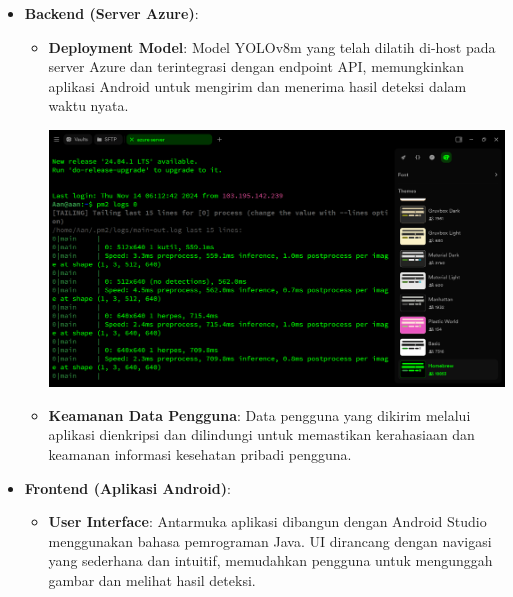 \documentclass[journal,article,submit,pdftex,moreauthors]{Definitions/mdpi}
\begin{document}
\begin{itemize}
    \item \textbf{Backend (Server Azure)}:
    \begin{itemize}
        \item \textbf{Deployment Model}: Model YOLOv8m yang telah dilatih di-host pada server Azure dan terintegrasi dengan endpoint API, memungkinkan aplikasi Android untuk mengirim dan menerima hasil deteksi dalam waktu nyata.

         \begin{minipage}{0.9\textwidth}
            \centering
            \includegraphics[width=\textwidth]{images/azure.png}
            \vspace{-15pt}
            \captionsetup{justification=centering, margin=130pt}
        \end{minipage}%

        \vspace{10pt}
        
        \item \textbf{Keamanan Data Pengguna}: Data pengguna yang dikirim melalui aplikasi dienkripsi dan dilindungi untuk memastikan kerahasiaan dan keamanan informasi kesehatan pribadi pengguna.
    \end{itemize}
    
    \item \textbf{Frontend (Aplikasi Android)}:
    \begin{itemize}
        \item \textbf{User Interface}: Antarmuka aplikasi dibangun dengan Android Studio menggunakan bahasa pemrograman Java. UI dirancang dengan navigasi yang sederhana dan intuitif, memudahkan pengguna untuk mengunggah gambar dan melihat hasil deteksi.


\end{itemize}
\end{itemize}
\end{document}
